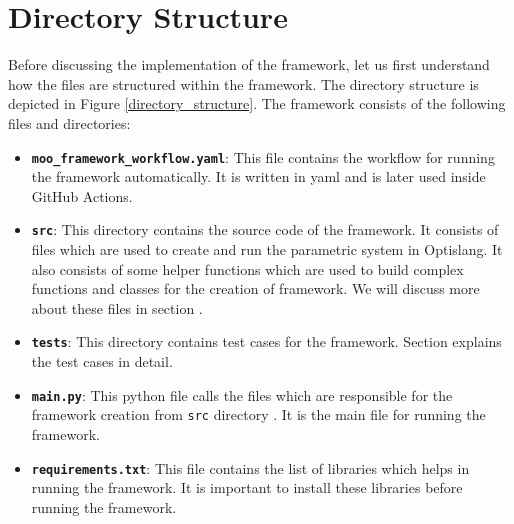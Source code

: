 \section{Directory Structure} \label{directory_structure_section}
Before discussing the implementation of the framework, let us first understand how the files are structured within the framework. The directory structure is 
depicted in Figure \ref{directory_structure}. The framework consists of the following files and directories:
\begin{itemize}
    \item \textbf{\texttt{moo\_framework\_workflow.yaml}}:\newline
    This file contains the workflow for running the framework automatically. It is written in \acrshort{yaml} and is later used inside GitHub Actions.
    \item \textbf{\texttt{src}}:\newline
    This directory contains the source code of the framework. It consists of files which are used to create and run the parametric system in Optislang. It also
    consists of some helper functions which are used to build complex functions and classes for the creation of framework. We will discuss more about these files
    in section %
    .
    \item \textbf{\texttt{tests}}:\newline
    This directory contains test cases for the framework. Section %
    explains the test cases in detail.
    \item \textbf{\texttt{main.py}}:\newline
    This python file calls the files which are responsible for the framework creation from  \texttt{src} directory . It is the main file for running the framework.
    \item \textbf{\texttt{requirements.txt}}:\newline
    This file contains the list of libraries which helps in running the framework. It is important to install these libraries before running the framework.
\end{itemize}
\newpage %
